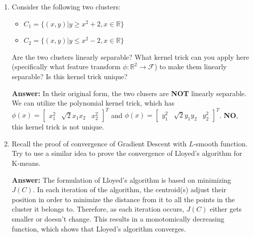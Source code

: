 \documentclass{assignment}
\newcommand{\R}{\mathbb{R}}
\begin{document}
\begin{problem}
\begin{enumerate}
\begin{enumerate}[label=(\alph*)]
    \end{enumerate}


    \item Consider the following two clusters:
    
    \begin{itemize}
        \item $C_1 = \{(x,y) | y \geq x^2 + 2, x \in \R\}$
        \item $C_2 = \{(x,y) | y \leq x^2 - 2, x \in \R\}$
    \end{itemize}

    Are the two clusters linearly separable? What kernel trick can you apply here (specifically what feature transform $\phi : \R^2 \rightarrow \mathcal{F}$) to make them linearly separable? Is this kernel trick unique?

    \color{blue}\textbf{Answer:} In their original form, the two clusers are \textbf{NOT} linearly separable. We can utilize the polynomial kernel trick, which has $\phi(x) = \begin{bmatrix}x_1^2 & \sqrt{2}x_1x_2 & x_2^2\end{bmatrix}^T$ and $\phi(x) = \begin{bmatrix}y_1^2 & \sqrt{2}y_1y_2 & y_2^2\end{bmatrix}^T$. \textbf{NO}, this kernel trick is not unique. \color{black}



    \item Recall the proof of convergence of Gradient Descent with $L$-smooth function. Try to use a similar idea to prove the convergence of Lloyed's algorithm for K-means.

    \color{blue}\textbf{Answer:} The formulation of Lloyed's algorithm is based on minimizing $J(C)$. In each iteration of the algorithm, the centroid(s) adjust their position in order to minimize the distance from it to all the points in the cluster it belongs to. Therefore, as each iteration occurs, $J(C)$ either gets smaller or doesn't change. This results in a monotomically decreasing function, which shows that Lloyed's algorithm converges. \color{black}



\end{enumerate}
\end{problem}
\end{document}
